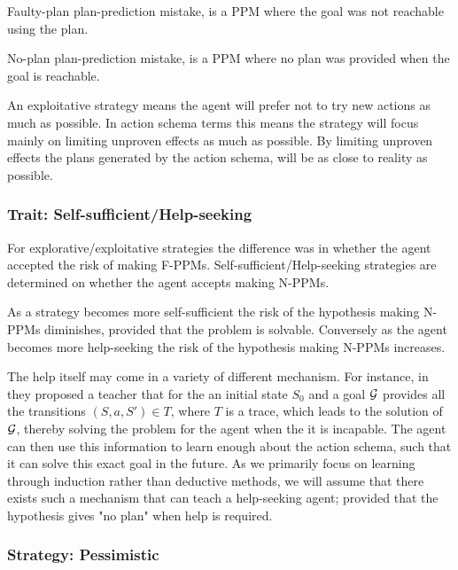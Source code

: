 \documentclass[\master/Master.tex]{subfiles}
\begin{document}
	\begin{definition} 
		[F-PPM] Faulty-plan plan-prediction mistake, is a PPM where the goal was not reachable using the plan.
	\end{definition}
	\begin{definition}
		[N-PPM] No-plan plan-prediction mistake, is a PPM where no plan was provided when the goal is reachable.
	\end{definition}
	An exploitative strategy means the agent will prefer not to try new actions as much as possible.
	In action schema terms this means the strategy will focus mainly on limiting unproven effects as much as possible.
	By limiting unproven effects the plans generated by the action schema, will be as close to reality as possible.




\subsubsection{Trait: Self-sufficient/Help-seeking}

	For explorative/exploitative strategies the difference was in whether the agent accepted the risk of making F-PPMs.
	Self-sufficient/Help-seeking strategies are determined on whether the agent accepts making N-PPMs.

	As a strategy becomes more self-sufficient the risk of the hypothesis making N-PPMs diminishes, provided that the problem is solvable.
	Conversely as the agent becomes more help-seeking the risk of the hypothesis making N-PPMs increases.

	The help itself may come in a variety  of different mechanism.
	For instance, in \cite{Walsh2008} they proposed a teacher that for the an initial state $S_0$ and a goal $\mathcal{G}$ provides all the transitions $(S,a,S') \in T$, where $T$ is a trace, which leads to the solution of $\mathcal{G}$,
	 thereby solving the problem for the agent when the it is incapable.
	The agent can then use this information to learn enough about the action schema, such that it can solve this exact goal in the future.
	As we primarily focus on learning through induction rather than deductive methods, we will assume that there exists such a mechanism that can teach a help-seeking agent;
	provided that the hypothesis gives "no plan" when help is required.

\subsubsection{Strategy: Pessimistic}
\end{document}
